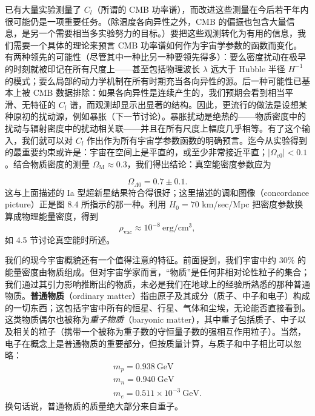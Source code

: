 已有大量实验测量了 $C_l$（所谓的 CMB 功率谱），而改进这些测量在今后若干年内很可能仍是一项重要任务。（除温度各向异性之外，CMB 的偏振也包含大量信息，是另一个需要相当多实验努力的目标。）要把这些观测转化为有用的信息，我们需要一个具体的理论来预言 CMB 功率谱如何作为宇宙学参数的函数而变化。有两种领先的可能性（尽管其中一种比另一种要领先得多）：要么密度扰动在极早的时刻就被印记在所有尺度上——甚至包括物理波长 $\lambda$ 远大于 Hubble 半径 $H^{-1}$ 的模式；要么局部的动力学机制在所有时期充当各向异性的源。后一种可能性已基本上被 CMB 数据排除：如果各向异性是连续产生的，我们预期会看到相当平滑、无特征的 $C_l$ 谱，而观测却显示出显著的结构。因此，更流行的做法是设想某种原初的扰动源，例如暴胀（下一节讨论）。暴胀扰动是绝热的——物质密度中的扰动与辐射密度中的扰动相关联——并且在所有尺度上幅度几乎相等。有了这个输入，我们就可以对 $C_l$ 作出作为所有宇宙学参数函数的明确预言。迄今从实验得到的最重要约束或许是：宇宙在空间上是平直的，或至少非常接近平直；$|\Omega_{\mathrm{c}0}|<0.1$。结合物质密度的测量 $\Omega_{\mathrm{M}}\approx 0.3$，我们得出结论：真空能密度参数应为

\begin{equation*}
\Omega_{\Lambda 0} = 0.7\pm 0.1.
\tag{8.161}
\end{equation*}
这与上面描述的 Ia 型超新星结果符合得很好；这里描述的调和图像（concordance picture）正是图 8.4 所指示的那一种。利用 $H_0=70$ km/sec/Mpc 把密度参数换算成物理能量密度，得到
\begin{equation*}
\rho_{\mathrm{vac}} \approx 10^{-8}\ \mathrm{erg/cm^{3}},
\tag{8.162}
\end{equation*}
如 4.5 节讨论真空能时所述。

我们的现今宇宙概貌还有一个值得注意的特征。前面提到，我们宇宙中约 $30\%$ 的能量密度由物质组成。但对宇宙学家而言，“物质”是任何非相对论性粒子的集合；我们通过其引力影响推断出的物质，未必是我们在地球上的经验所熟悉的那种普通物质。\textbf{普通物质}（ordinary matter）指由原子及其成分（质子、中子和电子）构成的一切东西；这包括宇宙中所有的恒星、行星、气体和尘埃，无论能否直接看到。这类物质偶尔也被称为\emph{重子物质}（baryonic matter），其中重子包括质子、中子以及相关的粒子（携带一个被称为重子数的守恒量子数的强相互作用粒子）。当然，电子在概念上是普通物质的重要部分，但按质量计算，与质子和中子相比可以忽略：
\begin{gather*}
m_p = 0.938\ \mathrm{GeV}\\
m_n = 0.940\ \mathrm{GeV}\\
m_e = 0.511\times 10^{-3}\ \mathrm{GeV}.
\tag{8.163}
\end{gather*}
换句话说，普通物质的质量绝大部分来自重子。

